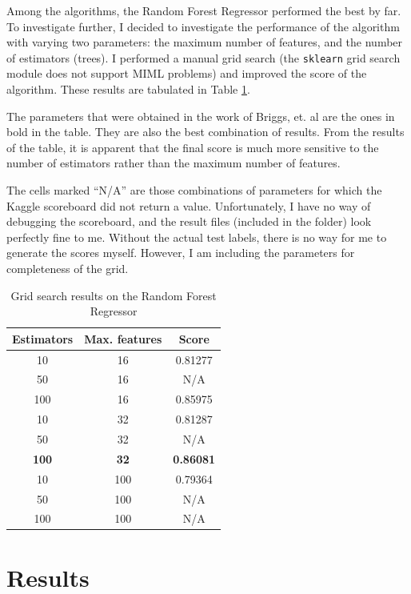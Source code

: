 \documentclass[11pt]{article}
\begin{document}
Among the algorithms, the Random Forest Regressor performed the best by far. To investigate further, I decided to investigate the performance of the algorithm with varying two parameters: the maximum number of features, and the number of estimators (trees). I performed a manual grid search (the \texttt{sklearn} grid search module does not support MIML problems) and improved the score of the algorithm. These results are tabulated in Table \ref{tab-refinement}.

The parameters that were obtained in the work of Briggs, et. al \cite{briggs-2012} are the ones in bold in the table. They are also the best combination of results. From the results of the table, it is apparent that the final score is much more sensitive to the number of estimators rather than the maximum number of features.

The cells marked ``N/A'' are those combinations of parameters for which the Kaggle scoreboard did not return a value. Unfortunately, I have no way of debugging the scoreboard, and the result files (included in the folder) look perfectly fine to me. Without the actual test labels, there is no way for me to generate the scores myself. However, I am including the parameters for completeness of the grid.

 \begin{table}
  \begin{center}
\begin{tabular}{ |c|c|c| }
\hline
 \textbf{Estimators} &  \textbf{Max. features} & \textbf{Score}  \\ \hline \hline
 10 & 16   & 0.81277 \\  \hline
 50 & 16  & N/A \\ \hline    
 100 & 16  & 0.85975 \\ \hline
 10 & 32  & 0.81287 \\ \hline
 50 & 32  & N/A \\ \hline
 \textbf{100} & \textbf{32}  & \textbf{0.86081} \\ \hline
 10 & 100  & 0.79364 \\ \hline
 50 & 100  & N/A \\ \hline
 100 & 100  & N/A \\ \hline
\end{tabular}
\caption{Grid search results on the Random Forest Regressor}
\label{tab-refinement}
\end{center}
\end{table}

\section{Results}
\end{document}
